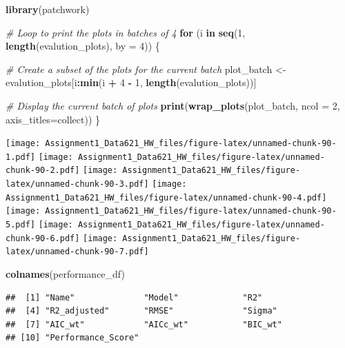 \documentclass[
]{article}
\newenvironment{Shaded}{\begin{snugshade}}{\end{snugshade}}
\newcommand{\AttributeTok}[1]{\textcolor[rgb]{0.13,0.29,0.53}{#1}}
\newcommand{\CommentTok}[1]{\textcolor[rgb]{0.56,0.35,0.01}{\textit{#1}}}
\newcommand{\ControlFlowTok}[1]{\textcolor[rgb]{0.13,0.29,0.53}{\textbf{#1}}}
\newcommand{\DecValTok}[1]{\textcolor[rgb]{0.00,0.00,0.81}{#1}}
\newcommand{\FunctionTok}[1]{\textcolor[rgb]{0.13,0.29,0.53}{\textbf{#1}}}
\newcommand{\NormalTok}[1]{#1}
\newcommand{\OtherTok}[1]{\textcolor[rgb]{0.56,0.35,0.01}{#1}}
\newcommand{\SpecialCharTok}[1]{\textcolor[rgb]{0.81,0.36,0.00}{\textbf{#1}}}
\newcommand{\StringTok}[1]{\textcolor[rgb]{0.31,0.60,0.02}{#1}}
\begin{document}
\begin{Shaded}
\begin{Highlighting}[]
\FunctionTok{library}\NormalTok{(patchwork)}

\CommentTok{\# Loop to print the plots in batches of 4}
\ControlFlowTok{for}\NormalTok{ (i }\ControlFlowTok{in} \FunctionTok{seq}\NormalTok{(}\DecValTok{1}\NormalTok{, }\FunctionTok{length}\NormalTok{(evalution\_plots), }\AttributeTok{by =} \DecValTok{4}\NormalTok{)) \{}
  
  \CommentTok{\# Create a subset of the plots for the current batch}
\NormalTok{  plot\_batch }\OtherTok{\textless{}{-}}\NormalTok{ evalution\_plots[i}\SpecialCharTok{:}\FunctionTok{min}\NormalTok{(i }\SpecialCharTok{+} \DecValTok{4} \SpecialCharTok{{-}} \DecValTok{1}\NormalTok{, }\FunctionTok{length}\NormalTok{(evalution\_plots))]}
  
  \CommentTok{\# Display the current batch of plots}
  \FunctionTok{print}\NormalTok{(}\FunctionTok{wrap\_plots}\NormalTok{(plot\_batch, }\AttributeTok{ncol =} \DecValTok{2}\NormalTok{, }\AttributeTok{axis\_titles=}\StringTok{\textquotesingle{}collect\textquotesingle{}}\NormalTok{))  }
\NormalTok{\}}
\end{Highlighting}
\end{Shaded}

\texttt{[image: Assignment1\_Data621\_HW\_files/figure-latex/unnamed-chunk-90-1.pdf]}
\texttt{[image: Assignment1\_Data621\_HW\_files/figure-latex/unnamed-chunk-90-2.pdf]}
\texttt{[image: Assignment1\_Data621\_HW\_files/figure-latex/unnamed-chunk-90-3.pdf]}
\texttt{[image: Assignment1\_Data621\_HW\_files/figure-latex/unnamed-chunk-90-4.pdf]}
\texttt{[image: Assignment1\_Data621\_HW\_files/figure-latex/unnamed-chunk-90-5.pdf]}
\texttt{[image: Assignment1\_Data621\_HW\_files/figure-latex/unnamed-chunk-90-6.pdf]}
\texttt{[image: Assignment1\_Data621\_HW\_files/figure-latex/unnamed-chunk-90-7.pdf]}

\begin{Shaded}
\begin{Highlighting}[]
\FunctionTok{colnames}\NormalTok{(performance\_df)}
\end{Highlighting}
\end{Shaded}

\begin{verbatim}
##  [1] "Name"              "Model"             "R2"               
##  [4] "R2_adjusted"       "RMSE"              "Sigma"            
##  [7] "AIC_wt"            "AICc_wt"           "BIC_wt"           
## [10] "Performance_Score"
\end{verbatim}
\end{document}
